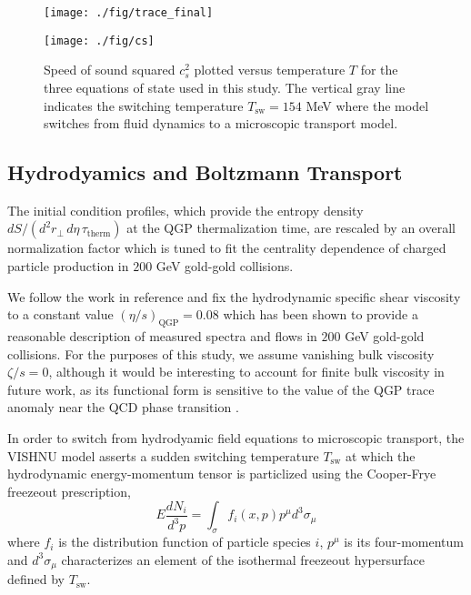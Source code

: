 \documentclass[aps,prc,reprint,amsmath,nofootinbib,superscriptaddress]{revtex4-1}
\begin{document}
\begin{figure}[b]
  \texttt{[image: ./fig/trace\_final]}
  \caption{\label{fig:trace_final} }
\end{figure}

\begin{figure}
  \texttt{[image: ./fig/cs]}
  \caption{\label{fig:cs} Speed of sound squared $c_s^2$ plotted versus temperature $T$ for the three equations of state used in this study. The vertical
	   gray line indicates the switching temperature $T_\text{sw} = 154$ MeV where the model switches from fluid dynamics to a microscopic transport model.}
\end{figure}

\subsection{Hydrodyamics and Boltzmann Transport}

The initial condition profiles, which provide the entropy density $dS/(d^2r_\perp\, d\eta\, \tau_\text{therm})$ at the QGP thermalization time, are rescaled by an overall normalization factor which is tuned to fit the centrality dependence of charged particle production in $200$ GeV gold-gold collisions.

We follow the work in reference \cite{?} and fix the hydrodynamic specific shear viscosity to a constant value $(\eta/s)_\text{QGP}=0.08$ which has been shown to provide a reasonable description of measured spectra and flows in $200$ GeV gold-gold collisions. 
For the purposes of this study, we assume vanishing bulk viscosity $\zeta/s=0$, although it would be interesting to account for finite bulk viscosity in future work, as its functional form is sensitive to the value of the QGP trace anomaly near the QCD phase transition \cite{?}.

In order to switch from hydrodyamic field equations to microscopic transport, the VISHNU model asserts a sudden switching temperature $T_\text{sw}$ at which the hydrodynamic energy-momentum tensor is particlized using the Cooper-Frye freezeout prescription,
\begin{equation}
 E\frac{dN_i}{d^3p} = \int_\sigma f_i(x,p) p^\mu d^3\sigma_\mu
 \label{cooper-frye}
\end{equation}
where $f_i$ is the distribution function of particle species $i$, $p^\mu$ is its four-momentum and $d^3\sigma_\mu$ characterizes an element of the isothermal freezeout hypersurface defined by $T_\text{sw}$.
\end{document}
